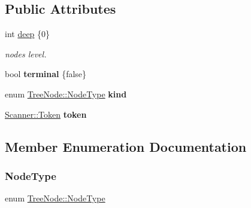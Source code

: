 \subsection*{Public Attributes}
\begin{DoxyCompactItemize}
\item 
\hypertarget{class_tree_node_a303725338fb06e7b9af7399e49d0349c}{}\label{class_tree_node_a303725338fb06e7b9af7399e49d0349c} 
int \hyperlink{class_tree_node_a303725338fb06e7b9af7399e49d0349c}{deep} \{0\}
\begin{DoxyCompactList}\small\item\em node\textquotesingle{}s level. \end{DoxyCompactList}\item 
\hypertarget{class_tree_node_a226b9c8f9092850e587a187bca0766f5}{}\label{class_tree_node_a226b9c8f9092850e587a187bca0766f5} 
bool {\bfseries terminal} \{false\}
\item 
\hypertarget{class_tree_node_a0356b323f5d3e9cb2d393d439771af15}{}\label{class_tree_node_a0356b323f5d3e9cb2d393d439771af15} 
enum \hyperlink{class_tree_node_a62f65fbb26a3d18a773f8e7f201303b3}{Tree\+Node\+::\+Node\+Type} {\bfseries kind}
\item 
\hypertarget{class_tree_node_a7bb7b4103a78bb399d7ed87c2f406ae3}{}\label{class_tree_node_a7bb7b4103a78bb399d7ed87c2f406ae3} 
\hyperlink{struct_scanner_1_1_token}{Scanner\+::\+Token} {\bfseries token}
\end{DoxyCompactItemize}


\subsection{Member Enumeration Documentation}
\hypertarget{class_tree_node_a62f65fbb26a3d18a773f8e7f201303b3}{}\label{class_tree_node_a62f65fbb26a3d18a773f8e7f201303b3} 
\subsubsection{\texorpdfstring{Node\+Type}{NodeType}}
{\footnotesize\ttfamily enum \hyperlink{class_tree_node_a62f65fbb26a3d18a773f8e7f201303b3}{Tree\+Node\+::\+Node\+Type}}

